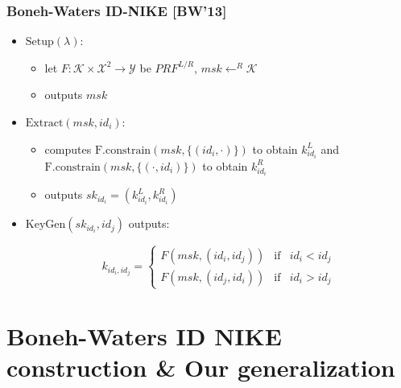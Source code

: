 \documentclass{beamer}
\begin{document}
\begin{frame}
  \frametitle{Boneh-Waters ID-NIKE [BW'13]}

\begin{itemize}
	\item $\mathrm{Setup}(\lambda)$:
		\begin{itemize}
			\item  let $F : \mathcal{K} \times \mathcal{X}^2 \rightarrow \mathcal{Y}$ be $PRF^{L/R}$, $msk \leftarrow^R \mathcal{K}$
			\item outputs $msk$
		\end{itemize}
	\item $\mathrm{Extract}(msk,id_i)$:
		\begin{itemize}
			\item  computes $\mathrm{F.constrain}(msk, \{(id_i, \cdot)\})$ to obtain $k^{L}_{id_i}$ and  $\mathrm{F.constrain}(msk, \{(\cdot, id_i)\})$  to obtain $k^{R}_{id_i}$
			\item outputs $sk_{id_i} = (k^{L}_{id_i},k^{R}_{id_i})$
		\end{itemize}
	\item $\mathrm{KeyGen}(sk_{id_i},id_j)$ outputs:

\[ k_{id_i,id_j} = \left\{ \begin{array}{lll}
F(msk, (id_i, id_j)) & \mbox{if} & id_i < id_j \\
F(msk, (id_j, id_i)) & \mbox{if} & id_i > id_j
\end{array}\right.
\]

\end{itemize}

\end{frame}


\section{Boneh-Waters ID NIKE construction & Our generalization}
\end{document}
